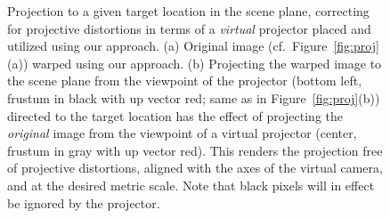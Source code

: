 \documentclass[review]{elsarticle}
\begin{document}
\begin{figure}[t]
    \centering
    \qquad
    \caption{Projection to a given target location in the scene plane, correcting for projective distortions in terms of a \textit{virtual} projector placed and utilized using our approach. (a) Original image (cf.\ Figure~\ref{fig:proj}(a)) warped using our approach. (b) Projecting the warped image to the scene plane from the viewpoint of the projector (bottom left, frustum in black with up vector red; same as in Figure~\ref{fig:proj}(b)) directed to the target location has the effect of projecting the \textit{original} image from the viewpoint of a virtual projector (center, frustum in gray with up vector red). This renders the projection free of projective distortions, aligned with the axes of the virtual camera, and at the desired metric scale. Note that black pixels will in effect be ignored by the projector.}
    \label{fig:warp}
\end{figure}
\end{document}
